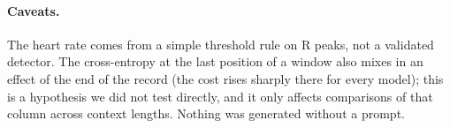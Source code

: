 

\paragraph{Caveats.} The heart rate comes from a simple threshold rule on R peaks, not a validated
detector. The cross-entropy at the last position of a window also mixes in an effect of the end of the
record (the cost rises sharply there for every model); this is a hypothesis we did not test directly,
and it only affects comparisons of that column across context lengths. Nothing was generated without a
prompt.
